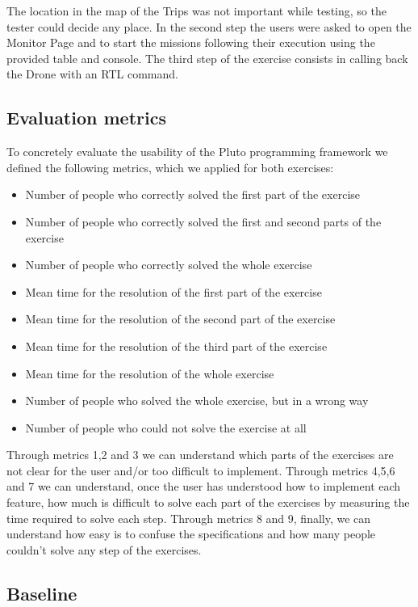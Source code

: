 The location in the map of the Trips was not important while testing, so the tester could decide any place.
In the second step the users were asked to open the Monitor Page and to start the missions following their execution using the provided table and console.
The third step of the exercise consists in calling back the Drone with an RTL command.


\subsection{Evaluation metrics}\label{metrics}

To concretely evaluate the usability of the Pluto programming framework we defined the following metrics, which we applied for both exercises:

\begin{itemize}
\item {Number of people who correctly solved the first part of the exercise}
\item {Number of people who correctly solved the first and second parts of the exercise}
\item {Number of people who correctly solved the whole exercise}
\item {Mean time for the resolution of the first part of the exercise}
\item {Mean time for the resolution of the second part of the exercise}
\item {Mean time for the resolution of the third part of the exercise}
\item {Mean time for the resolution of the whole exercise}
\item {Number of people who solved the whole exercise, but in a wrong way}
\item {Number of people who could not solve the exercise at all}
\end{itemize}

Through metrics 1,2 and 3 we can understand which parts of the exercises are not clear for the user and/or too difficult to implement. 
Through metrics 4,5,6 and 7 we can understand, once the user has understood how to implement each feature, how much is difficult to solve each part of the exercises by measuring the time required to solve each step.
Through metrics 8 and 9, finally, we can understand how easy is to confuse the specifications and how many people couldn't solve any step of the exercises.


\subsection{Baseline}

